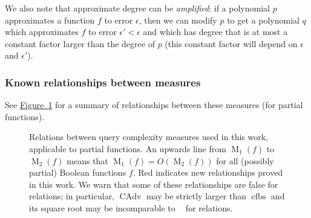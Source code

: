 \documentclass[10pt,a4paper]{article}
\theoremstyle{definition}
\newcommand{\fig}[1]{\hyperref[fig:#1]{Figure~\ref*{fig:#1}}}
\renewcommand{\>}{\rangle}
\newcommand{\<}{\langle}
\DeclareMathOperator{\R}{R}
\DeclareMathOperator{\Q}{Q}
\DeclareMathOperator{\bs}{bs}
\DeclareMathOperator{\fbs}{fbs}
\DeclareMathOperator{\cbs}{cbs}
\DeclareMathOperator{\cfbs}{cfbs}
\DeclareMathOperator{\Adv}{Adv}
\DeclareMathOperator{\M}{M}
\DeclareMathOperator{\CAdv}{CAdv}
\DeclareMathOperator{\adeg}{\widetilde{\deg}}
\begin{document}
We also note that approximate degree can be \emph{amplified}:
if a polynomial $p$ approximates a function $f$ to error
$\epsilon$, then we can modify $p$ to get a polynomial $q$
which approximates $f$ to error $\epsilon'<\epsilon$
and which has degree that is at most a constant factor
larger than the degree of $p$ (this constant
factor will depend on $\epsilon$ and $\epsilon'$).

\subsubsection{Known relationships between measures}

See \fig{relations} for a summary of relationships
between these measures (for partial functions).

\begin{figure}
\centering
    \caption{Relations between query complexity
    measures used in this work, applicable to partial functions.
    An upwards line from $\M_1(f)$ to $\M_2(f)$ means
    that $\M_1(f)=O(\M_2(f))$ for all (possibly partial) Boolean
    functions $f$. {\color{red}Red} indicates new
    relationships proved in this work.
    We warn that some of these relationships
    are false for relations; in particular, $\CAdv$ may
    be strictly larger than $\cfbs$ and its square root
    may be incomparable to $\adeg$ for relations.
    \label{fig:relations}}
\end{figure}
\end{document}
